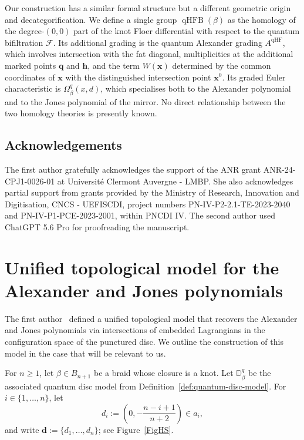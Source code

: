 \documentclass[11pt]{amsart}
\numberwithin{equation}{section}
\numberwithin{figure}{section}
\theoremstyle{definition}
\newcommand{\cF}{\mathcal{F}}
\newcommand{\bD}{\mathbb{D}}
\newcommand{\ds}{\boldsymbol{d}}
\DeclareMathOperator{\qHF}{qHF}
\DeclareMathOperator{\qHFB}{qHFB}
\newcommand{\hs}{\boldsymbol{h}}
\newcommand{\qs}{\boldsymbol{q}}
\newcommand{\xs}{\boldsymbol{x}}
\begin{document}
Our construction has a similar formal structure but a different geometric origin and decategorification. We define a single group $\qHFB(\beta)$ as the homology of the degree-$(0,0)$ part of the knot Floer differential with respect to the quantum bifiltration $\cF$. Its additional grading is the quantum Alexander grading $A^{\qHF}$, which involves intersection with the fat diagonal, multiplicities at the additional marked points $\qs$ and $\hs$, and the term $W(\xs)$ determined by the common coordinates of $\xs$ with the distinguished intersection point $\xs^0$. Its graded Euler characteristic is $\Omega_\beta^q(x,d)$, which specialises both to the Alexander polynomial and to the Jones polynomial of the mirror. No direct relationship between the two homology theories is presently known.

\subsection*{Acknowledgements} 
 The first author gratefully acknowledges the support of the ANR grant ANR-24-CPJ1-0026-01 at Universit\'e Clermont Auvergne - LMBP. She also acknowledges partial support from grants provided by the Ministry of Research, Innovation and Digitisation, CNCS - UEFISCDI, project numbers  PN-IV-P2-2.1-TE-2023-2040 and PN-IV-P1-PCE-2023-2001, within PNCDI IV. The second author used ChatGPT 5.6 Pro for proofreading the manuscript. %

\section{Unified topological model for the Alexander and Jones polynomials}\label{S:unifmodel}

The first author~\cite{Anghel2024AIF} defined a unified topological model that recovers the Alexander and Jones polynomials via intersections of embedded Lagrangians in the configuration space of the punctured disc. We outline the construction of this model in the case that will be relevant to us.

For $n \ge 1$, let $\beta \in B_{n+1}$ be a braid whose closure is a knot. Let $\bD^q_\beta$ be the associated quantum disc model from Definition~\ref{def:quantum-disc-model}. For $i \in \{1,\dots,n\}$, let
\[
d_i := \left(0,-\frac{n-i+1}{n+2}\right) \in a_i,
\]
and write $\ds := \{d_1,\dots,d_n\}$; see Figure~\ref{FigHS}.
\end{document}
